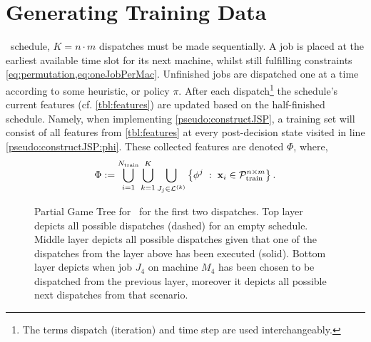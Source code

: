 
\chapter{Generating Training Data}\label{ch:gentrdat} 

 \jsp\ schedule, $K=n\cdot m$ 
dispatches must be made sequentially.
A job is placed at the earliest available time slot for its next machine, 
whilst still fulfilling constraints \cref{eq:permutation,eq:oneJobPerMac}.
Unfinished jobs are dispatched one at a time according to some heuristic, or 
policy $\pi$. 
After each dispatch\footnote{The terms dispatch (iteration) and time step are 
    used interchangeably.} the schedule's current features (cf. 
\cref{tbl:features}) are updated based on the half-finished schedule. Namely, 
when implementing \cref{pseudo:constructJSP}, a training set will consist of 
all features from \cref{tbl:features} at every post-decision state visited in 
line \ref{pseudo:constructJSP:phi}. 
These collected features are denoted $\Phi$, where, 
\begin{equation}\label{eq:Phi}
\Phi:= \bigcup_{i=1}^{N_{\train}} 
\bigcup_{k=1}^K\bigcup_{J_j\in\mathcal{L}^{(k)}} 
\condset{\vphi^j}{\vec{x}_i\in\mathcal{P}^{n\times m}_{\train} }.
\end{equation}

\begin{figure}[p]
    
    \vspace{-27pt}
    \caption[Partial Game Tree for \jsp]{Partial Game Tree for \jsp\ for the 
        first two dispatches. 
        Top layer depicts all possible dispatches (dashed) for an empty 
        schedule. 
        Middle layer depicts all possible dispatches given that one of the 
        dispatches from the layer above has been executed (solid). 
        Bottom layer depicts when job $J_4$ on machine $M_4$ has been chosen to 
        be dispatched from the previous layer, moreover it depicts all possible 
        next dispatches from that scenario.}
    \label{fig:example:gametree}
\end{figure}

\vspace*{-24pt}
